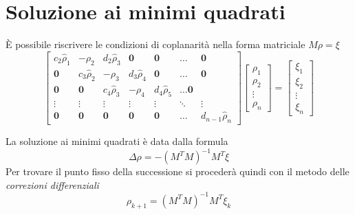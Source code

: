 \documentclass{beamer}
\begin{document}
\section{Soluzione ai minimi quadrati}
\begin{frame}
\`E possibile riscrivere le condizioni di coplanarit\`a nella forma matriciale $M \rho =\xi$
\begin{equation*}
\begin{bmatrix}
c_2 \hat{\rho}_1 & -\rho_2 & d_2 \hat{\rho}_3 & \mathbf{0} & \mathbf{0}  & \dots & \mathbf{0} \\
\mathbf{0} & c_3 \hat{\rho}_2 & -\rho_3 & d_3 \hat{\rho}_4 & \mathbf{0} & \dots &  \mathbf{0} \\
\mathbf{0} & \mathbf{0}  & c_4 \hat{\rho}_3 & -\rho_4 & d_4 \hat{\rho}_5 & \dots \mathbf{0} \\
\vdots & \vdots & \vdots & \vdots & \vdots & \ddots & \vdots \\
\mathbf{0}  & \mathbf{0}  & \mathbf{0}  & \mathbf{0}  & \mathbf{0}  & \dots & d_{n-1} \hat{\rho}_{n}
\end{bmatrix}
\begin{bmatrix}
\rho_1 \\
\rho_2 \\
\vdots \\
\rho_n
\end{bmatrix}=\begin{bmatrix}
\xi_1\\
\xi_2 \\
\vdots \\
\xi_n
\end{bmatrix}
\end{equation*}
\end{frame}
\begin{frame}[plain]
La soluzione ai minimi quadrati \`e data dalla formula \begin{equation}
\Delta \rho = -(M^T M)^{-1} M^T \xi
\end{equation}
Per trovare il punto fisso della successione si proceder\`a quindi con il metodo delle \emph{correzioni differenziali} \begin{equation}
\rho_{k+1}= (M^T M)^{-1} M^T \xi_k
\end{equation}
\end{frame}
\end{document}
